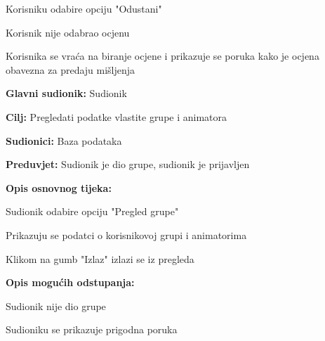 \begin{packed_item}
\begin{packed_item}
\begin{packed_enum}
								\item Korisniku odabire opciju "Odustani"

							\end{packed_enum}
							\item[4.a] Korisnik nije odabrao ocjenu
							\item[] \begin{packed_enum}
								
								\item Korisnika se vraća na biranje ocjene i prikazuje se poruka kako je ocjena obavezna za predaju mišljenja
								
							\end{packed_enum}
						\end{packed_item}
					\end{packed_item}
					
					\noindent {}
					\begin{packed_item}
						
						\item \textbf{Glavni sudionik: }Sudionik
						\item  \textbf{Cilj:} Pregledati podatke vlastite grupe i animatora
						\item  \textbf{Sudionici:} Baza podataka
						\item  \textbf{Preduvjet:} Sudionik je dio grupe, sudionik je prijavljen
						\item  \textbf{Opis osnovnog tijeka:}
						
						\item[] \begin{packed_enum}
							
							\item Sudionik odabire opciju "Pregled grupe"
							\item Prikazuju se podatci o korisnikovoj grupi i animatorima
							\item Klikom na gumb "Izlaz" izlazi se iz pregleda
						\end{packed_enum}
						
						\item  \textbf{Opis mogućih odstupanja:}
						
						\item[] \begin{packed_item}
							
							\item[2.a] Sudionik nije dio grupe
							\item[] \begin{packed_enum}
								
								\item Sudioniku se prikazuje prigodna poruka
								
							\end{packed_enum}
							
						\end{packed_item}
					\end{packed_item}
				
